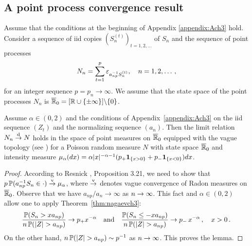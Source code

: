 \subsection{A point process convergence result}
Assume that the conditions at the beginning of Appendix \ref{appendix:Ach3} hold.
Consider a sequence of iid copies $(S_{n}^{(t)})_{t=1,2,\ldots}$
of $S_n$ and the sequence of point processes
\begin{equation*}
N_n= \sum_{t=1}^{p} \varepsilon_{a_{np}^{-1} S_{n}^{(t)}}, \quad n=1,2,\ldots\,,
\end{equation*}
for an integer sequence $p=p_n\to\infty$. We assume that the state space of the
point processes $N_n$ is $\overline{\mathbb{R}}_0=[\mathbb{R}\cup\{\pm \infty\}]\backslash \{0\}$.
\begin{lemma}\label{lem:pprch3}
Assume $\alpha \in (0,2)$ and the
conditions of  Appendix~\ref{appendix:Ach3}
on the iid sequence $(Z_t)$ and the normalizing sequence $(a_n)$. Then the limit relation
$N_n\stackrel{\rm d}{\rightarrow} N$ holds in the space of point measures on $\overline{\mathbb{R}}_0$
equipped with the vague topology (see
\cite{resnick:1987,resnick:2007})
for a  Poisson random measure $N$ with state space $\overline{\mathbb{R}}_0$ and intensity measure $\mu_\alpha(dx)=\alpha |x|^{-\alpha-1} (p_+ \mathbf{1}_{\{x>0\}}+ p_- \mathbf{1}_{\{x<0\}}) dx$.
\end{lemma}
\begin{proof}
According to Resnick \cite{resnick:1987}, Proposition 3.21, we need to
show that
$p\, \mathbb{P}(a_{np}^{-1}S_n\in \cdot)\stackrel{\rm v}{\rightarrow} \mu_\alpha
$,
where $\stackrel{\rm v}{\rightarrow}$ denotes vague convergence of Radon measures on  $\overline{\mathbb{R}}_0$.
Observe that we have $a_{np}/a_n\to\infty$ as $n \to \infty$. This fact and
$\alpha\in (0,2)$ allow one to apply
Theorem~\ref{thm:nagaevch3}:
\begin{equation*}
\dfrac{\P( S_n >x a_{np})}{n\,\P(|Z|>  a_{np})}\to p_+ x^{-\alpha}
\quad \mbox{and}\quad \dfrac{\P( S_n \le -x a_{np})}{n\,\P(|Z|>
  a_{np})}\to p_-\, x^{-\alpha}\,,\quad x>0\,.
\end{equation*}
On the other hand, $n\,\P(|Z|>  a_{np})\sim p^{-1}$ as $n \to \infty$.
This proves the lemma.
\end{proof}


